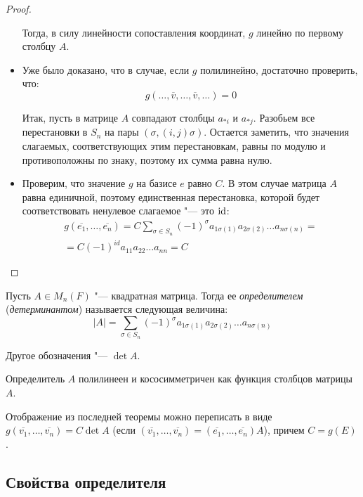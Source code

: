 \begin{proof}
\begin{itemize}
		Тогда, в силу линейности сопоставления координат, $g$ линейно по первому столбцу $A$.
		\item Уже было доказано, что в случае, если $g$ полилинейно, достаточно проверить, что:
		\[g(\dots, \overline{v}, \dots, \overline{v}, \dots) = 0\]
		
		Итак, пусть в матрице $A$ совпадают столбцы $a_{*i}$ и $a_{*j}$. Разобьем все перестановки в $S_n$ на пары $(\sigma, (i,j)\sigma)$. Остается заметить, что значения слагаемых, соответствующих этим перестановкам, равны по модулю и противоположны по знаку, поэтому их сумма равна нулю.
		
		\item Проверим, что значение $g$ на базисе $e$ равно $C$. В этом случае матрица $A$ равна единичной, поэтому единственная перестановка, которой будет соответствовать ненулевое слагаемое "--- это $\mathrm{id}$:
		\begin{multline*}
			g(\overline{e_1}, \dots, \overline{e_n}) = C\sum_{\sigma \in S_n}(-1)^\sigma a_{1 \sigma(1)}a_{2 \sigma(2)}\dots a_{n \sigma(n)} =\\
			= C(-1)^{id}a_{11}a_{22}\dots a_{nn} = C
		\end{multline*}
	\end{itemize}
\end{proof}

\begin{definition}
	Пусть $A \in M_n(F)$ "--- квадратная матрица. Тогда ее \textit{определителем} (\textit{детерминантом}) называется следующая величина:
	\[|A| = \sum_{\sigma \in S_n}(-1)^\sigma a_{1 \sigma(1)}a_{2 \sigma(2)}\dots a_{n \sigma(n)}\]
	
	Другое обозначения "--- $\det{A}$.
\end{definition}

\begin{note}
	Определитель $A$ полилинеен и кососимметричен как функция столбцов матрицы $A$.
\end{note}

\begin{note}
	Отображение из последней теоремы можно переписать в виде $g(\overline{v_1}, \dots, \overline{v_n}) = C\det{A}$ (если $(\overline{v_1}, \dots, \overline{v_n}) = (\overline{e_1}, \dots, \overline{e_n})A$), причем $C = g(E)$.
\end{note}

\subsection{Свойства определителя}
	
